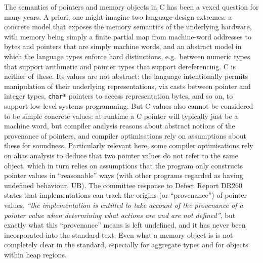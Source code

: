 \documentclass[acmsmall,review,screen]{acmart}\settopmatter{printfolios=true,printccs=false,printacmref=false}
\begin{document}
The semantics of pointers and memory objects in C has been a vexed 
question for many years. 
%
A priori, one might imagine two language-design extremes: 
%
a concrete model that exposes the memory semantics of the underlying
hardware, with memory being simply a finite partial map from
machine-word addresses to bytes and pointers that are simply machine words,
%
and an abstract model in which the language types enforce hard
distinctions, e.g.~between numeric types that support arithmetic and
pointer types that support dereferencing.
%
C is neither of these.
Its values are not abstract: the language intentionally permits manipulation of their
underlying representations, via casts between pointer and integer
types, \texttt{char*} pointers to access representation bytes, and so on,
to support low-level systems programming.
%
But C values also cannot be considered to be simple concrete values: 
at runtime a C pointer will typically just be a machine word, 
but compiler analysis reasons about abstract notions of the 
provenance of pointers, 
and compiler optimisations rely on assumptions about these for soundness. 
Particularly relevant here, 
some compiler optimisations rely on alias analysis to deduce that two
pointer values do not refer to the same object, which in turn
relies on assumptions that the program only constructs pointer values
in ``reasonable'' ways (with other programs regarded as having
undefined behaviour, UB).  The committee response to Defect Report
DR260~\cite{dr260} states that implementations can track the origins (or ``provenance'')
of pointer values, 
\emph{``the implementation is entitled to take account of the
 provenance of a pointer value when determining what actions are and
  are not defined''}, but exactly what this ``provenance'' means is
left undefined, and it has never been incorporated into the standard
text.   Even what a memory object is is not completely
clear in the standard, especially for aggregate types and for objects
within heap
regions.  
\end{document}
